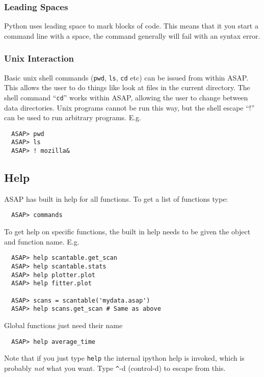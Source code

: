 \documentclass[11pt]{article}
\newcommand{\cmd}[1]{{\tt #1}}
\begin{document}
\subsubsection{Leading Spaces}

Python uses leading space to mark blocks of code. This means that it
you start a command line with a space, the command generally will
fail with an syntax error.

\subsubsection{Unix Interaction}

Basic unix shell commands (\cmd{pwd}, \cmd{ls}, \cmd{cd} etc) can be
issued from within ASAP. This allows the user to do things like look
at files in the current directory. The shell command ``\cmd{cd}''
works within ASAP, allowing the user to change between data
directories. Unix programs cannot be run this way, but the shell
escape ``$!$'' can be used to run arbitrary programs. E.g.

\begin{verbatim}
  ASAP> pwd
  ASAP> ls
  ASAP> ! mozilla&
\end{verbatim}

\subsection{Help}

ASAP has built in help for all functions. To get a list of functions type:

\begin{verbatim}
  ASAP> commands
\end{verbatim}

To get help on specific functions, the built in help needs to be given
the object and function name. E.g.

\begin{verbatim}
  ASAP> help scantable.get_scan
  ASAP> help scantable.stats
  ASAP> help plotter.plot
  ASAP> help fitter.plot

  ASAP> scans = scantable('mydata.asap')
  ASAP> help scans.get_scan # Same as above
\end{verbatim}

Global functions just need their name

\begin{verbatim}
  ASAP> help average_time 
\end{verbatim}

Note that if you just type \cmd{help} the internal ipython help is
invoked, which is probably {\em not} what you want. Type \verb+^+-d
(control-d) to escape from this.
\end{document}
